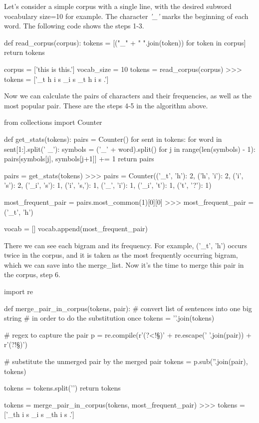 Let's consider a simple corpus with a single line, with the desired subword vocabulary size=10 for example. The character \emph{'\_'} marks the beginning of each word. The following code shows the steps 1-3.

\begin{python}
def read_corpus(corpus):
    tokens = [("_" + " ".join(token)) for token in corpus]
    return tokens

corpus = ['this is this.']
vocab_size = 10
tokens = read_corpus(corpus)
>>> tokens = ['_t h i s _i s _t h i s .']
\end{python}

Now we can calculate the pairs of characters and their frequencies, as well as the most popular pair. These are the steps 4-5 in the algorithm above.

\begin{python}
from collections import Counter

def get_stats(tokens):
    pairs = Counter()
    for sent in tokens:
        for word in sent[1:].split(' _'):
            symbols = ('_' + word).split()
            for j in range(len(symbols) - 1):
                pairs[symbols[j], symbols[j+1]] += 1
    return pairs

pairs = get_stats(tokens)
>>> pairs = Counter({('_t', 'h'): 2, ('h', 'i'): 2, ('i', 's'): 2, 
                    ('_i', 's'): 1, ('i', 's,'): 1, ('_', 'i'): 1, 
                    ('_i', 't'): 1, ('t', '?'): 1})

most_frequent_pair = pairs.most_common(1)[0][0]
>>> most_frequent_pair = ('_t', 'h')

vocab = []
vocab.append(most_frequent_pair)
\end{python}

There we can see each bigram and its frequency. For example, ('\_t', 'h') occurs twice in the corpus, and it is taken as the most frequently occurring bigram, which we can save into the merge\_list. Now it's the time to merge this pair in the corpus, step 6.

\begin{python}
import re

def merge_pair_in_corpus(tokens, pair):
    # convert list of sentences into one big string
    # in order to do the substitution once
    tokens = '\n'.join(tokens)

    # regex to capture the pair
    p = re.compile(r'(?<!\S)' + re.escape(' '.join(pair)) + r'(?!\S)')

    # substitute the unmerged pair by the merged pair
    tokens = p.sub(''.join(pair), tokens)

    tokens = tokens.split('\n')
    return tokens

tokens = merge_pair_in_corpus(tokens, most_frequent_pair)
>>> tokens = ['_th i s _i s _th i s .']
\end{python}

